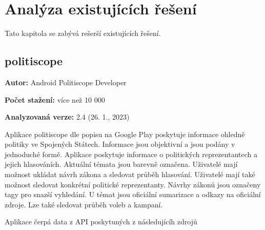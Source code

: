 \chapter{Analýza existujících řešení}

\setcounter{page}{1}

\begin{chapterabstract}
Tato kapitola se zabývá rešerší existujících řešení.
\end{chapterabstract}

\section{politiscope}

\begin{description}
	\item \textbf{Autor:} Android Politiscope Developer
	\item \textbf{Počet stažení:} více než 10 000
	\item \textbf{Analyzovaná verze:} 2.4 (26. 1., 2023)
\end{description}

Aplikace politiscope \cite{politiscope} dle popisu na Google Play poskytuje informace ohledně politiky ve Spojených Státech. Informace jsou objektivní a jsou podány v jednoduché formě. Aplikace poskytuje informace o politických reprezentantech a jejich hlasováních. Aktuální témata jsou barevně označena. Uživatelé mají možnost ukládat návrh zákona a sledovat průběh hlasování. Uživatelé mají také možnost sledovat konkrétní politické reprezentanty. Návrhy zákonů jsou označeny tagy pro snazší vyhledání. U témat jsou oficiální sumarizace a odkazy na oficiální zdroje. Lze také sledovat průběh voleb a kampaní.

Aplikace čerpá data z API poskytuných z následujícíh zdrojů


